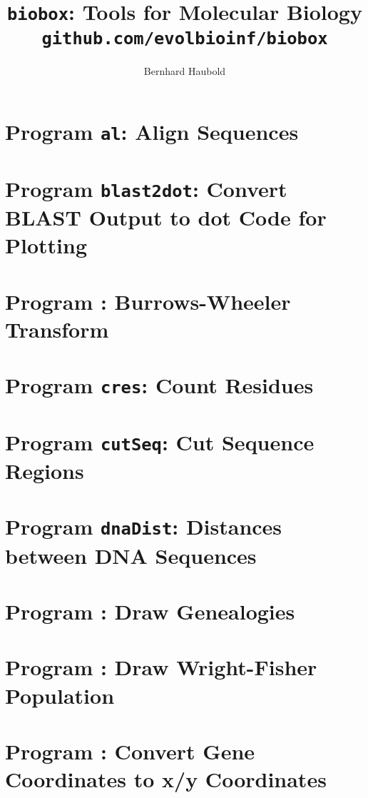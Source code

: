 \documentclass[a4paper]{report}
\begin{document}
\pagestyle{noweb}

\title{\texttt{biobox}: Tools for Molecular Biology\\
\small\texttt{github.com/evolbioinf/biobox}}
\author{Bernhard Haubold}
\maketitle
\tableofcontents

\chapter{Program \texttt{al}: Align Sequences}\label{ch:al}

\chapter{Program \texttt{blast2dot}: Convert BLAST Output to dot Code
  for Plotting}\label{ch:b2d}

\chapter{Program : Burrows-Wheeler Transform}\label{ch:bw}

\chapter{Program \texttt{cres}: Count Residues}\label{ch:cr}

\chapter{Program \texttt{cutSeq}: Cut Sequence Regions}\label{ch:cut}

\chapter{Program \texttt{dnaDist}: Distances between DNA Sequences}\label{ch:dna}

\chapter{Program : Draw Genealogies}\label{ch:dgn}

\chapter{Program : Draw Wright-Fisher
  Population}\label{ch:dw}

\chapter{Program : Convert Gene Coordinates to x/y
  Coordinates}\label{ch:dg}

\end{document}
